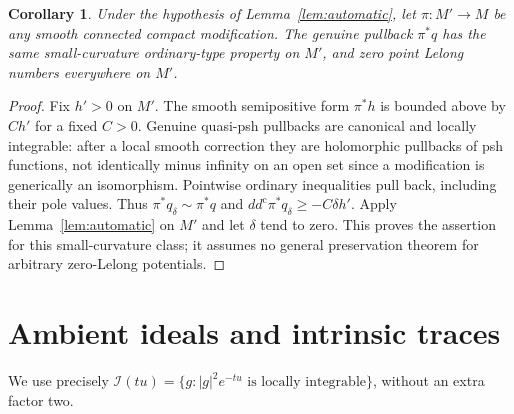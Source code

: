\documentclass[11pt]{article}
\newtheorem{corollary}[theorem]{Corollary}
\theoremstyle{remark}
\newcommand{\ddc}{dd^{\mathrm c}}
\begin{document}
\begin{corollary}\label{cor:all-modifications}
Under the hypothesis of Lemma~\ref{lem:automatic}, let
$\pi:M'\to M$ be any smooth connected compact modification. The genuine
pullback $\pi^*q$ has the same small-curvature ordinary-type property on
$M'$, and zero point Lelong numbers everywhere on $M'$.
\end{corollary}
\begin{proof}
Fix $h'>0$ on $M'$. The smooth semipositive form $\pi^*h$ is bounded
above by $C h'$ for a fixed $C>0$. Genuine quasi-psh pullbacks are
canonical and locally integrable: after a local smooth correction they
are holomorphic pullbacks of psh functions, not identically minus infinity
on an open set since a modification is generically an isomorphism.
Pointwise ordinary inequalities pull back, including their pole values.
Thus $\pi^*q_\delta\sim\pi^*q$ and
$\ddc\pi^*q_\delta\geq-C\delta h'$. Apply
Lemma~\ref{lem:automatic} on $M'$ and let $\delta$ tend to zero.
This proves the assertion for this small-curvature class; it assumes no
general preservation theorem for arbitrary zero-Lelong potentials.
\end{proof}

\section{Ambient ideals and intrinsic traces}
We use precisely $\mathcal I(tu)=\{g:|g|^2e^{-tu}\text{ is locally
integrable}\}$, without an extra factor two.
\end{document}
